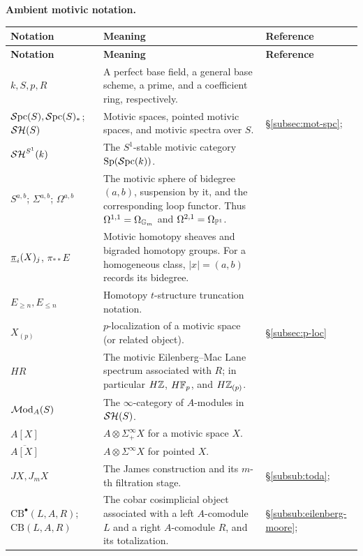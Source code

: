 \documentclass{amsart}
\numberwithin{proposition}{section}
\numberwithin{equation}{section}
\newcommand{\Sp}{\mathrm{Sp}}
\newcommand{\CB}{\mathrm{CB}}
\begin{document}
\medskip
\noindent\textbf{Ambient motivic notation.}
\renewcommand{\arraystretch}{1.15}
\begin{longtable}{@{}>{\raggedright\arraybackslash}p{}>{\raggedright\arraybackslash}p{}>{\raggedright\arraybackslash}p{}@{}}
\textbf{Notation} & \textbf{Meaning} & \textbf{Reference} \\
\hline
\endfirsthead
\textbf{Notation} & \textbf{Meaning} & \textbf{Reference} \\
\hline
\endhead
$k,S,p,R$ & A perfect base field, a general base scheme, a prime, and a coefficient ring, respectively. &  \\
$\Spc(S),\Spc(S)_*$; $\SH(S)$ & Motivic spaces, pointed motivic spaces, and motivic spectra over $S$. & \S\ref{subsec:mot-spc}; \cite[\S2.2, \S4.1]{bachmann-norms} \\
$\SH^{S^1}(k)$ & The $S^1$-stable motivic category $\Sp(\Spc(k))$. & \\
$S^{a,b}$; $\Sigma^{a,b}$; $\Omega^{a,b}$ & The motivic sphere of bidegree $(a,b)$, suspension by it, and the corresponding loop functor.  Thus $\Omega^{1,1}=\Omega_{\Gm}$ and $\Omega^{2,1}=\Omega_{\P^1}$. &  \\
$\ul\pi_i(X)_j$, $\pi_{**}E$ & Motivic homotopy sheaves and bigraded homotopy groups.  For a homogeneous class, $|x|=(a,b)$ records its bidegree. & \\
$E_{\ge n},E_{\le n}$ & Homotopy $t$-structure truncation notation. & \cite[\S\S4.3, 5.2]{morel-trieste} \\
$X_{(p)}$ & $p$-localization of a motivic space (or related object). & \S\ref{subsec:p-loc} \\
$HR$ & The motivic Eilenberg--Mac Lane spectrum associated with $R$; in particular $H\Z$, $H\F_p$, and $H\Z_{(p)}$. & \cite{spitzweck2012commutative} \\
$\Mod_A(S)$ & The $\infty$-category of $A$-modules in $\SH(S)$. &  \\
$A[X]$ & $A\otimes\Sigma^\infty_+X$ for a motivic space $X$. & \\
$\overline{A[X]}$ & $A\otimes\Sigma^\infty X$ for pointed $X$. & \\
$JX,J_mX$ & The James construction and its $m$-th filtration stage. & \S\ref{subsub:toda}; \cite[Construction~5.1]{devalapurkar2019james} \\
$\CB^\bullet(L,A,R)$; $\CB(L,A,R)$ & The cobar cosimplicial object associated with a left $A$-comodule $L$ and a right $A$-comodule $R$, and its totalization. & \S\ref{subsub:eilenberg-moore}; \cite[Theorem~4.4.2.8]{lurie-ha} \\
\end{longtable}
\end{document}

